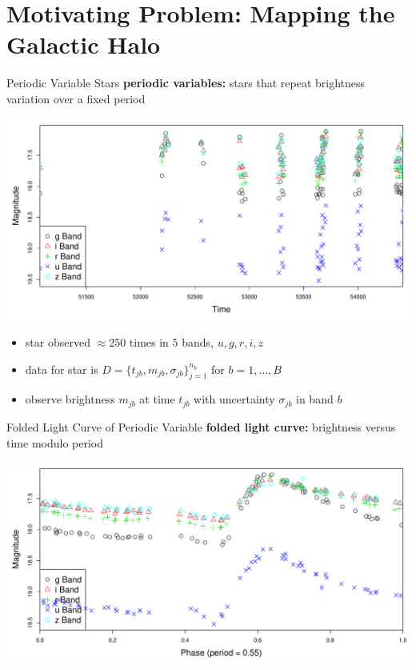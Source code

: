 \documentclass[12pt]{beamer}
\begin{document}



\section{Motivating Problem: Mapping the Galactic Halo}

\begin{frame}{Periodic Variable Stars}
\textbf{periodic variables:} stars that repeat brightness variation over a fixed period
\begin{center}
\includegraphics[scale=.3]{figs/unfolded_13350.pdf}
\end{center}
\begin{itemize}
\item star observed $\approx 250$ times in $5$ bands, $u,g,r,i,z$
\item data for star is $D=\{t_{jb},m_{jb},\sigma_{jb}\}_{j=1}^{n_b}$ for $b=1,\ldots,B$
\item observe brightness $m_{jb}$ at time $t_{jb}$ with uncertainty $\sigma_{jb}$ in band $b$
\end{itemize}
\end{frame}


\begin{frame}{Folded Light Curve of Periodic Variable}
\textbf{folded light curve:} brightness versus time modulo period
\begin{center}
\includegraphics[scale=.3]{figs/folded_13350.pdf}
\end{center}
\end{frame}
\end{document}
